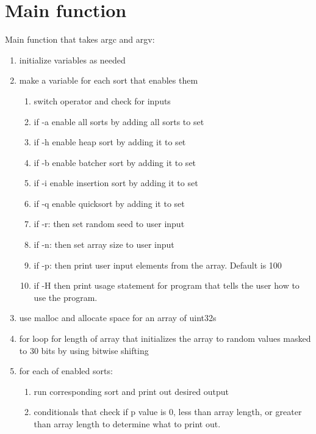 \documentclass[11pt]{article}
\begin{document}
\section{Main function}\label{ss:main}
Main function that takes argc and argv:
\begin{enumerate}
\item initialize variables as needed
\item make a variable for each sort that enables them 
	\begin{enumerate}
	\item switch operator and check for inputs
	\item if -a enable all sorts by adding all sorts to set
	\item if -h enable heap sort by adding it to set
	\item if -b enable batcher sort by adding it to set
	\item if -i enable insertion sort by adding it to set
	\item if -q enable quicksort by adding it to set
	\item if -r: then set random seed to user input
	\item if -n: then set array size to user input
	\item if -p: then print user input elements from the array. Default is 100
	\item if -H then print usage statement for program that tells the user how to use the program.
	\end{enumerate}
\item use malloc and allocate space for an array of uint32s
\item for loop for length of array that initializes the array to random values masked to 30 bits by using bitwise shifting
\item for each of enabled sorts:
	\begin{enumerate}
	\item run corresponding sort and print out desired output
	\item conditionals that check if p value is 0, less than array length, or greater than array length to determine what to print out.
	\end{enumerate}
\end{enumerate}
\end{document}
